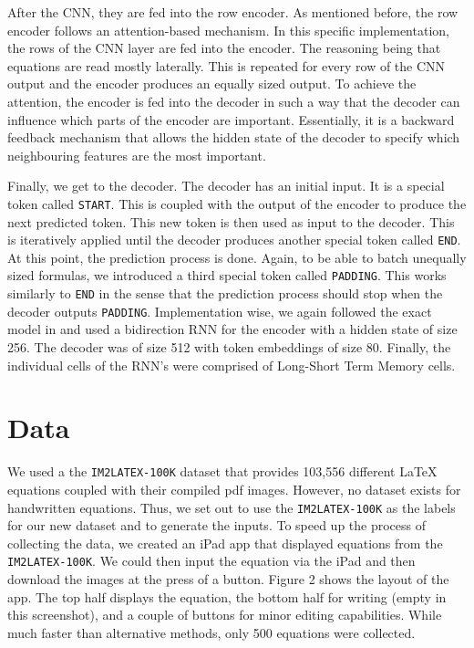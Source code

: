 \documentclass{article}
\begin{document}
After the CNN, they are fed into the row encoder. As mentioned before, the row encoder follows
an attention-based mechanism. In this specific implementation, the rows of the CNN layer are
fed into the encoder. The reasoning being that equations are read mostly laterally. This is repeated for every
row of the CNN output and the encoder produces an equally sized output. To achieve the
attention, the encoder is fed into the decoder in such a way that the decoder can
influence which parts of the encoder are important. Essentially, it is a backward
feedback mechanism that allows the hidden state of the decoder to specify which
neighbouring features are the most important.

Finally, we get to the decoder. The decoder has an initial input. It is a
special token called \texttt{START}. This is coupled with the output of the encoder to produce
the next predicted token. This new token is then used as input to the decoder. This is iteratively
applied until the decoder produces another special token called \texttt{END}. At this point,
the prediction process is done. Again, to be able to batch unequally sized formulas, we introduced
a third special token called \texttt{PADDING}. This works similarly to \texttt{END} in
the sense that the prediction process should stop when the decoder outputs \texttt{PADDING}.
Implementation wise, we again followed the exact model in \cite{1609.04938} and used
a bidirection RNN for the encoder with a hidden state of size 256. The decoder was
of size 512 with token embeddings of size 80. Finally, the individual cells of the RNN's
were comprised of Long-Short Term Memory cells.

\section*{Data}

We used a the \texttt{IM2LATEX-100K} dataset that provides 103,556 different
\LaTeX{} equations coupled with their compiled pdf images. However, no dataset
exists for handwritten equations. Thus, we set out to use the \texttt{IM2LATEX-100K}
as the labels for our new dataset and to generate the inputs. To speed up the process
of collecting the data, we created an iPad app that displayed equations from the
\texttt{IM2LATEX-100K}. We could then input the equation via the iPad and then
download the images at the press of a button. Figure 2 shows the layout of the app.
The top half displays the equation, the bottom half for writing (empty in this screenshot),
and a couple of buttons for minor editing capabilities. While much faster than alternative
methods, only 500 equations were collected.
\end{document}
